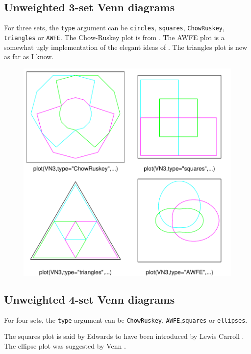 \documentclass[a4paper]{article}
\begin{document}
\newpage
\subsection{Unweighted 3-set Venn diagrams}
For three sets, the \texttt{type} argument
can be \texttt{circles}, \texttt{squares}, 
\texttt{ChowRuskey}, \texttt{triangles} or \texttt{AWFE}.
The Chow-Ruskey plot is from \cite{chowruskey:2005}.
The AWFE plot is a somewhat ugly implementation of the elegant
ideas of  \cite{edwards:2004}. 
The triangles plot is new as far as I know.


\begin{figure}[H]\begin{center}
\includegraphics{Vennfig-pv3uwww}
\end{center}\end{figure}
\newpage
\subsection{Unweighted 4-set Venn diagrams}
For four sets, the \texttt{type} argument
can be  \texttt{ChowRuskey}, \texttt{AWFE},\texttt{squares} or \texttt{ellipses}.

The squares plot is said by Edwards \cite{edwards:2004} to have
been introduced by Lewis Carroll \cite{carroll:1896}.
The ellipse plot was suggested by Venn \cite{venn:1880}.
\end{document}
